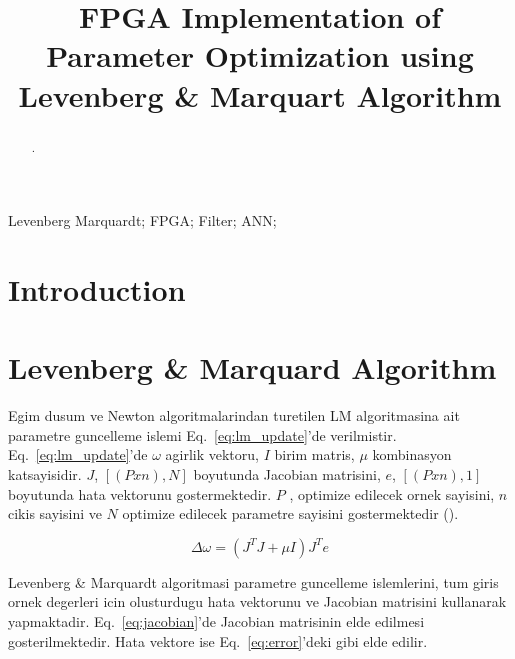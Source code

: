 \documentclass[]{interact}
\theoremstyle{plain}%
\theoremstyle{definition}
\theoremstyle{remark}
\begin{document}

\title{FPGA Implementation of Parameter Optimization using Levenberg \& Marquart Algorithm}

\author{
}

\maketitle

\begin{abstract}
.
\end{abstract}

\begin{keywords}
Levenberg Marquardt; FPGA; Filter; ANN;
\end{keywords}


\section{Introduction}

\section{Levenberg \& Marquard Algorithm}

Egim dusum ve Newton algoritmalarindan turetilen LM algoritmasina ait parametre guncelleme islemi Eq.~\ref{eq:lm_update}'de verilmistir. Eq.~\ref{eq:lm_update}'de $\omega$ agirlik vektoru, $I$ birim matris, $\mu$ kombinasyon katsayisidir. $J$, $[(P x n), N]$ boyutunda Jacobian matrisini, $e$, $[(P x n), 1]$ boyutunda hata vektorunu gostermektedir. $P$ , optimize edilecek ornek sayisini, $n$ cikis sayisini ve $N$ optimize edilecek parametre sayisini gostermektedir (\citealt{Wil98}).

\begin{equation}
\label{eq:lm_update}
 \Delta\omega=(J^TJ+\mu I)J^Te
\end{equation}

Levenberg \& Marquardt algoritmasi parametre guncelleme islemlerini, tum giris ornek degerleri icin olusturdugu hata vektorunu ve Jacobian matrisini kullanarak yapmaktadir. Eq.~\ref{eq:jacobian}'de Jacobian matrisinin elde edilmesi gosterilmektedir. Hata vektore ise Eq.~\ref{eq:error}'deki gibi elde edilir.
\end{document}
